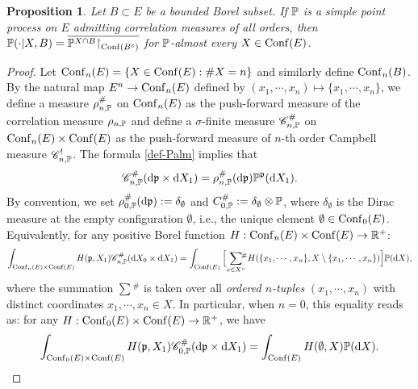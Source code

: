 \documentclass[12pt]{paper}
\newtheorem{proposition}[theorem]{Proposition}
\numberwithin{theorem}{section}
\numberwithin{figure}{section}
\numberwithin{equation}{section}
\begin{document}
\begin{proposition}\label{prop-bdd-cond}
Let $B\subset E$ be a bounded Borel subset. If $\mathbb{P}$ is a simple point process on $E$ admitting correlation  measures of all orders, then
$  \mathbb{P}(\cdot | X, B) = \overline{\mathbb{P}^{X\cap B}\mathord{\upharpoonright}_{\mathrm{Conf}(B^c)}}$ for $\mathbb{P}$-almost every $X \in \mathrm{Conf}(E)$.
\end{proposition}




\begin{proof}
Let $\mathrm{Conf}_n(E) =\{X \in \mathrm{Conf}(E): \# X = n\}$ and similarly define $\mathrm{Conf}_n(B)$. By the natural map $E^n \rightarrow \mathrm{Conf}_n(E)$ defined by
$(x_1, \cdots, x_n) \mapsto  \{x_1, \cdots, x_n\}$,
we define a measure $\rho^\#_{n, \mathbb{P}}$ on $\mathrm{Conf}_n(E)$  as the push-forward measure of  the correlation measure $\rho_{n, \mathbb{P}}$ and define a $\sigma$-finite measure $\mathscr{C}_{n, \mathbb{P}}^\#$  on $\mathrm{Conf}_n(E)\times \mathrm{Conf}(E)$ as the push-forward measure of $n$-th order Campbell measure $\mathscr{C}_{n, \mathbb{P}}^{!}$. The formula \eqref{def-Palm}  implies that
\begin{align}\label{dis-campbell}
\mathscr{C}_{n, \mathbb{P}}^\# (\mathrm{d}  \mathfrak{p} \times \mathrm{d} X_1) = \rho_{n, \mathbb{P}}^\#(\mathrm{d} \mathfrak{p})  \mathbb{P}^{\mathfrak{p}} ( \mathrm{d}  X_1).
\end{align}
By convention,  we set $ \rho_{0, \mathbb{P}}^\#(\mathrm{d} \mathfrak{p}) :=  \delta_{\emptyset}$ and
   $C_{0, \mathbb{P}}^\#:= \delta_\emptyset \otimes\mathbb{P}$, where $\delta_\emptyset$ is the Dirac measure at the empty configuration $\emptyset$, i.e.,  the unique element $\emptyset \in \mathrm{Conf}_0(E)$.
  Equivalently, for any positive Borel function $H: \mathrm{Conf}_n(E) \times \mathrm{Conf}(E)\rightarrow\mathbb{R}^{+}$:
\begin{align*}
\int_{\mathrm{Conf}_n(E) \times \mathrm{Conf}(E)}   H(\mathfrak{p}, X_1)  \mathscr{C}_{n, \mathbb{P}}^\# (\mathrm{d} X_0 \times \mathrm{d} X_1) =  \int_{\mathrm{Conf}(E)}   \Big[  {\sum_{x \in X^n}}\!\!\!^{\#}   H(\{x_1, \cdots, x_n\},  X\setminus \{x_1, \cdots, x_n\}) \Big]  \mathbb{P}(\mathrm{d}  X),
\end{align*}
where the summation ${\sum\!^{\#}}$ is taken over all {\it ordered $n$-tuples} $(x_1, \cdots, x_n)$ with distinct coordinates $x_1, \cdots, x_n \in X$. In particular, when $n=0$, this equality reads as: for any $H: \mathrm{Conf}_0(E) \times \mathrm{Conf}(E)\rightarrow\mathbb{R}^{+}$, we have
\begin{align*}
\int_{\mathrm{Conf}_0(E) \times \mathrm{Conf}(E)}   H(\mathfrak{p}, X_1)  \mathscr{C}_{0, \mathbb{P}}^\# (\mathrm{d} \mathfrak{p} \times \mathrm{d} X_1) =  \int_{\mathrm{Conf}(E)}    H(\emptyset, X) \mathbb{P}(\mathrm{d} X).
\end{align*}


\end{proof}
\end{document}
